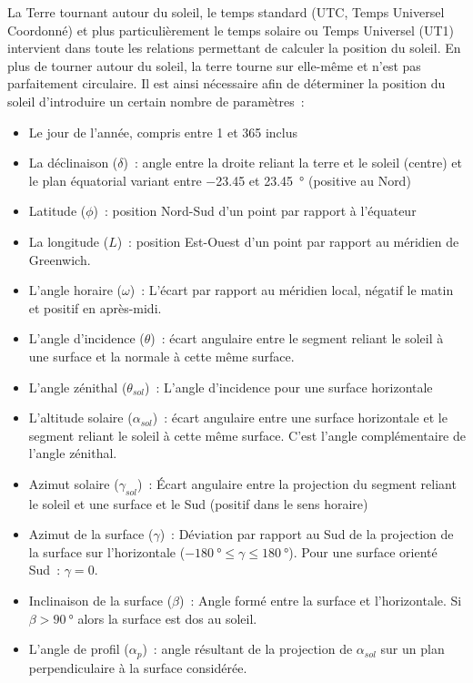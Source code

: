 La Terre tournant autour du soleil, le temps standard (UTC, Temps Universel Coordonné)
et plus particulièrement le temps solaire ou Temps Universel (UT1) intervient dans
toute les relations permettant de calculer la position du soleil.
En plus de tourner autour du soleil, la terre tourne sur elle-même et n’est pas
parfaitement circulaire. Il est ainsi nécessaire afin de déterminer la position
du soleil d’introduire un certain nombre de paramètres~:
\begin{itemize}
    \item Le jour de l’année, compris entre 1 et 365 inclus
    \item La déclinaison ($\delta$)~: angle entre la droite reliant la terre et le soleil
          (centre) et le plan équatorial variant entre \num{-23.45} et \SI{23.45}{\degree}
          (positive au Nord)
    \item Latitude ($\phi$)~: position Nord-Sud d’un point par rapport à l’équateur
    \item La longitude ($L$)~: position Est-Ouest d’un point par rapport au méridien de Greenwich.
    \item L’angle horaire ($\omega$)~: L’écart par rapport au méridien local, négatif le
          matin et positif en après-midi.
    \item L’angle d’incidence ($\theta$)~: écart angulaire entre le segment reliant le soleil
          à une surface et la normale à cette même surface.
    \item L’angle zénithal ($\theta_{sol}$)~: L’angle d’incidence pour une surface horizontale
    \item L’altitude solaire ($\alpha_{sol}$)~: écart angulaire entre une surface horizontale et le segment reliant
          le soleil à cette même surface. C’est l’angle complémentaire
          de l’angle zénithal.
    \item Azimut solaire ($\gamma_{sol}$)~: Écart angulaire entre la projection du segment reliant
          le soleil et une surface et le Sud (positif dans le sens horaire)
    \item Azimut de la surface ($\gamma$)~: Déviation par rapport au Sud de la projection
          de la surface sur l’horizontale ($\SI{-180}{\degree} \leq \gamma \leq \SI{180}{\degree}$). Pour une surface orienté Sud~: $\gamma=0$.
    \item Inclinaison de la surface ($\beta$)~: Angle formé entre la surface et l’horizontale.
          Si $\beta > \SI{90}{\degree}$ alors la surface est dos au soleil.
    \item L’angle de profil ($\alpha_{p}$)~: angle résultant de la projection de $\alpha_{sol}$ sur un plan perpendiculaire
          à la surface considérée.
\end{itemize}
